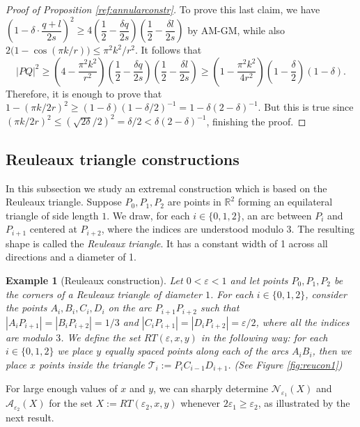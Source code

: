 \documentclass[12pt]{article}
\newtheorem{exam}{Example}
\newcommand{\eps}{\varepsilon}
\begin{document}
\begin{proof}[Proof of Proposition \ref{ref:annularconstr}]
 To prove this last claim, we have $\left(1-\delta\cdot \dfrac{q+l}{2s}\right)^2\ge 4\left(\dfrac{1}{2}-\dfrac{\delta q}{2s}\right)\left(\dfrac{1}{2}-\dfrac{\delta l}{2s}\right)$ by AM-GM,
 while also $2\big(1-\cos(\pi k/r)\big)\leq \pi^2k^2/r^2$. It follows that
 $$|PQ|^2\geq \left(4-\dfrac{\pi^2k^2}{r^2}\right)\left(\dfrac{1}{2}-\dfrac{\delta q}{2s}\right)\left(\dfrac{1}{2}-\dfrac{\delta l}{2s}\right)\geq \left(1-\dfrac{\pi^2k^2}{4r^2}\right)\left(1-\dfrac{\delta}{2}\right)(1-\delta).$$
  Therefore, it is enough to prove that $1-(\pi k/2r)^2\geq (1-\delta)(1-\delta/2)^{-1}=1-\delta(2-\delta)^{-1}$. But this is true since $(\pi k/2r)^2\leq (\sqrt{2\delta}/2)^2=\delta/2<\delta(2-\delta)^{-1}$, finishing the proof.
\end{proof}


\subsection{Reuleaux triangle constructions}

In this subsection we study an extremal construction which is based on the Reuleaux triangle. Suppose $P_0,P_1,P_2$ are points in $\mathbb{R}^2$ forming an equilateral triangle of side length $1$. We draw, for each $i\in \{0,1,2\}$, an arc between $P_i$ and $P_{i+1}$ centered at $P_{i+2}$, where the indices are understood modulo $3$. The resulting shape is called the \emph{Reuleaux triangle}. It has a constant width of 1 across all directions and a diameter of 1. 


\begin{exam}[Reuleaux construction]
    Let $0<\eps<1$ and let points $P_0,P_1,P_2$ be the corners of a Reuleaux triangle of diameter $1$. For each $i\in \{0,1,2\}$, consider the points $A_i, B_i,C_i,D_i$ on the arc $P_{i+1}P_{i+2}$ such that $|A_iP_{i+1}|=|B_iP_{i+2}|=1/3$ and $|C_iP_{i+1}|=|D_iP_{i+2}|=\eps/2$, where all the indices are modulo $3$. We define the set $RT(\eps,x,y)$ in the following way: for each $i\in\{0,1,2\}$ we place $y$ equally spaced points along each of the arcs $A_iB_i$, then we place $x$ points inside the triangle $\mathcal{T}_i:=P_iC_{i-1}D_{i+1}$.
    (See Figure \ref{fig:reucon1})  
\end{exam}



For large enough values of $x$ and $y$, we can sharply determine $\mathcal{N}_{\eps_1}(X)$ and $\mathcal{A}_{\eps_2}(X)$ for the set $X:=RT(\eps_2,x,y)$ whenever $2\eps_1\geq \eps_2$, as illustrated by the next result.
\end{document}
